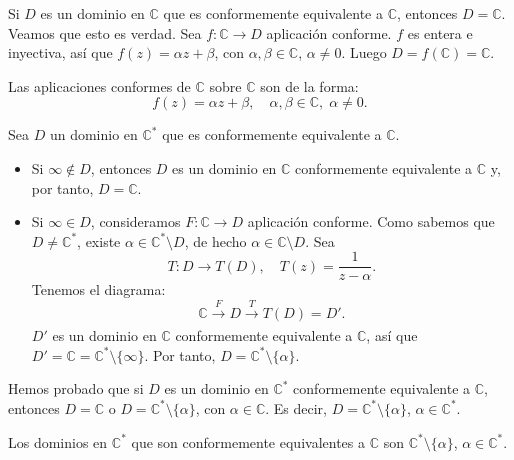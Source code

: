 Si $D$ es un dominio en $\mathbb{C}$ que es conformemente equivalente a $\mathbb{C}$, entonces $D = \mathbb{C}$.
Veamos que esto es verdad.
Sea $f: \mathbb{C} \to D$ aplicación conforme.
$f$ es entera e inyectiva, así que $f(z) = \alpha z + \beta$, con $\alpha, \beta \in \mathbb{C}$, $\alpha \neq 0$.
Luego $D = f(\mathbb{C}) = \mathbb{C}$.

Las aplicaciones conformes de $\mathbb{C}$ sobre $\mathbb{C}$ son de la forma:
$$f(z) = \alpha z + \beta, \quad \alpha, \beta \in \mathbb{C}, \; \alpha \neq 0.$$

Sea $D$ un dominio en $\mathbb{C}^\ast$ que es conformemente equivalente a $\mathbb{C}$.
\begin{itemize}
    \item Si $\infty \notin D$, entonces $D$ es un dominio en $\mathbb{C}$ conformemente equivalente a $\mathbb{C}$ y, por tanto, $D = \mathbb{C}$.
    \item Si $\infty \in D$, consideramos $F: \mathbb{C} \to D$ aplicación conforme.
          Como sabemos que $D \neq \mathbb{C}^\ast$, existe $\alpha \in \mathbb{C}^\ast \setminus D$, de hecho $\alpha \in \mathbb{C} \setminus D$.
          Sea
          $$T: D \to T(D), \quad T(z) = \frac{1}{z-\alpha}.$$
          Tenemos el diagrama:
          $$\mathbb{C} \xrightarrow[]{F} D \xrightarrow[]{T} T(D) = D'.$$
          $D'$ es un dominio en $\mathbb{C}$ conformemente equivalente a $\mathbb{C}$, así que $D' = \mathbb{C} = \mathbb{C}^\ast \setminus \{\infty\}$.
          Por tanto, $D = \mathbb{C}^\ast \setminus \{\alpha\}$.
\end{itemize}

Hemos probado que si $D$ es un dominio en $\mathbb{C}^\ast$ conformemente equivalente a $\mathbb{C}$, entonces $D = \mathbb{C}$ o $D = \mathbb{C}^\ast \setminus \{\alpha\}$, con $\alpha \in \mathbb{C}$.
Es decir, $D = \mathbb{C}^\ast \setminus \{\alpha\}$, $\alpha \in \mathbb{C}^\ast$.

Los dominios en $\mathbb{C}^\ast$ que son conformemente equivalentes a $\mathbb{C}$ son $\mathbb{C}^\ast \setminus \{\alpha\}$, $\alpha \in \mathbb{C}^\ast$.

